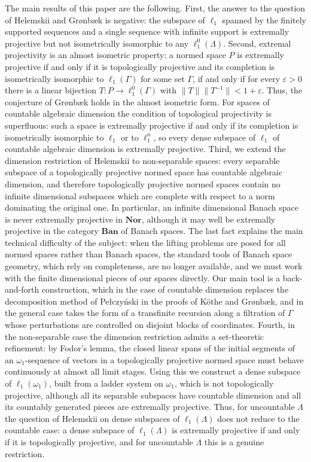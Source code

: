 \documentclass[12pt]{article}
\newcommand{\Nor}{\mathbf{Nor}}
\newcommand{\Ban}{\mathbf{Ban}}
\newcommand{\lo}[1]{\ell_1^0(#1)}
\newcommand{\ellone}[1]{\ell_1(#1)}
\newcommand{\norm}[1]{\lVert #1\rVert}
\begin{document}
The main results of this paper are the following. First, the answer to the
question of Helemskii and Gr{\o}nb{\ae}k is negative: the subspace of $\ell_1$
spanned by the finitely supported sequences and a single sequence with
infinite support is extremally projective but not isometrically isomorphic to
any $\lo{\Lambda}$. Second, extremal projectivity is an almost isometric
property: a normed space $P$ is extremally projective if and only if it is
topologically projective and its completion is isometrically isomorphic to
$\ellone{\Gamma}$ for some set $\Gamma$, if and only if for every
$\varepsilon>0$ there is a linear bijection $T:P\to\lo{\Gamma}$ with
$\norm{T}\norm{T^{-1}}<1+\varepsilon$. Thus, the conjecture of Gr{\o}nb{\ae}k
holds in the almost isometric form. For spaces of countable algebraic
dimension the condition of topological projectivity is superfluous: such a
space is extremally projective if and only if its completion is isometrically
isomorphic to $\ell_1$ or to $\ell_1^n$, so every dense subspace of $\ell_1$
of countable algebraic dimension is extremally projective. Third, we extend
the dimension restriction of Helemskii to non-separable spaces: every
separable subspace of a topologically projective normed space has countable
algebraic dimension, and therefore topologically projective normed spaces
contain no infinite dimensional subspaces which are complete with respect to
a norm dominating the original one. In particular, an infinite dimensional
Banach space is never extremally projective in $\Nor$, although it may well
be extremally projective in the category $\Ban$ of Banach spaces. The last
fact explains the main technical difficulty of the subject: when the lifting
problems are posed for all normed spaces rather than Banach spaces, the
standard tools of Banach space geometry, which rely on completeness, are no
longer available, and we must work with the finite dimensional pieces of our
spaces directly. Our main tool is a back-and-forth construction, which in the
case of countable dimension replaces the decomposition method of
Pe{\l}czy\'nski in the proofs of K\"othe and Gr{\o}nb{\ae}k, and in the
general case takes the form of a transfinite recursion along a filtration of
$\Gamma$ whose perturbations are controlled on disjoint blocks of
coordinates. Fourth, in the non-separable case the dimension restriction
admits a set-theoretic refinement: by Fodor's lemma, the closed linear spans
of the initial segments of an $\omega_1$-sequence of vectors in a
topologically projective normed space must behave continuously at almost all
limit stages. Using this we construct a dense subspace of $\ellone{\omega_1}$,
built from a ladder system on $\omega_1$, which is not topologically
projective, although all its separable subspaces have countable dimension and
all its countably generated pieces are extremally projective. Thus, for
uncountable $\Lambda$ the question of Helemskii on dense subspaces of
$\ellone{\Lambda}$ does not reduce to the countable case: a dense subspace of
$\ellone{\Lambda}$ is extremally projective if and only if it is topologically
projective, and for uncountable $\Lambda$ this is a genuine restriction.
\end{document}
